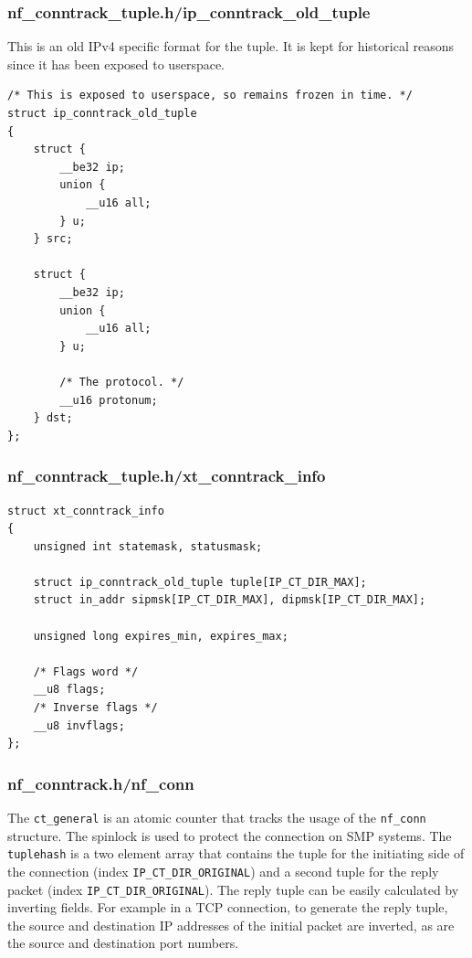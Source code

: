 \documentclass[a4paper,10pt]{article}
\newcommand{\code}[1]{\texttt{{#1}}}
\begin{document}
\subsubsection{nf\_conntrack\_tuple.h/ip\_conntrack\_old\_tuple}

This is an old IPv4 specific format for the tuple. It is kept for
historical reasons since it has been exposed to userspace.

\begin{lstlisting}
/* This is exposed to userspace, so remains frozen in time. */
struct ip_conntrack_old_tuple
{
	struct {
		__be32 ip;
		union {
			__u16 all;
		} u;
	} src;

	struct {
		__be32 ip;
		union {
			__u16 all;
		} u;

		/* The protocol. */
		__u16 protonum;
	} dst;
};
\end{lstlisting}

\subsubsection{nf\_conntrack\_tuple.h/xt\_conntrack\_info}

\begin{lstlisting}
struct xt_conntrack_info
{
	unsigned int statemask, statusmask;

	struct ip_conntrack_old_tuple tuple[IP_CT_DIR_MAX];
	struct in_addr sipmsk[IP_CT_DIR_MAX], dipmsk[IP_CT_DIR_MAX];

	unsigned long expires_min, expires_max;

	/* Flags word */
	__u8 flags;
	/* Inverse flags */
	__u8 invflags;
};
\end{lstlisting}



\subsubsection{nf\_conntrack.h/nf\_conn}\label{nf_conn}

The \code{ct\_general} is an atomic counter that tracks the usage of
the \code{nf\_conn} structure. The spinlock is used to protect the
connection on SMP systems. The \verb|tuplehash| is a two element array
that contains the tuple for the initiating side of the connection
(index \verb|IP_CT_DIR_ORIGINAL|) and a second tuple for the
reply packet (index \verb|IP_CT_DIR_ORIGINAL|). The reply tuple
can be easily calculated by inverting fields. For example in a TCP
connection, to generate the reply tuple, the source and destination IP
addresses of the initial packet are inverted, as are the source and
destination port numbers.
\end{document}
